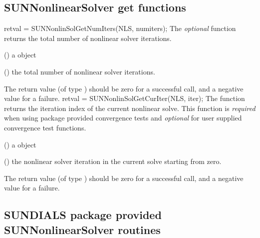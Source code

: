 \subsection{SUNNonlinearSolver get functions}
\label{ss:sunnonlinsol_getfn}
{
  retval = SUNNonlinSolGetNumIters(NLS, numiters);
}
{
  The \textit{optional} function  returns
  the total number of nonlinear solver iterations.
}
{
  \begin{args}[numiters]
  \item[NLS] ()
    a {\sunnonlinsol} object
  \item[numiters] ()
    the total number of nonlinear solver iterations.
  \end{args}
}
{
  The return value  (of type ) should be zero for a
  successful call, and a negative value for a failure.
}
{}
{
  retval = SUNNonlinSolGetCurIter(NLS, iter);
}
{
  The function  returns the iteration index
  of the current nonlinear solve. This function is \textit{required}
  when using {\sundials} package provided convergence tests and
  \textit{optional} for user supplied convergence test functions.
}
{
  \begin{args}[numiters]
  \item[NLS] ()
    a {\sunnonlinsol} object
  \item[iter] ()
    the nonlinear solver iteration in the current solve starting from
    zero.
  \end{args}
}
{
  The return value  (of type ) should be zero for a
  successful call, and a negative value for a failure.
}
{}

\subsection{SUNDIALS package provided SUNNonlinearSolver routines}
\label{ss:sunnonlinsol_sunsuppliedfn}

